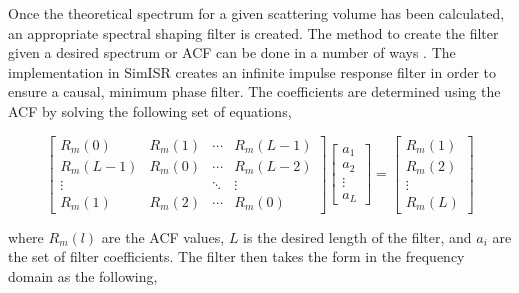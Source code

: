 

Once the theoretical spectrum for a given scattering volume has been calculated, an appropriate spectral shaping filter is created. The method to create the filter given a desired spectrum or ACF can be done in a number of ways \cite{Kasdin:1995wi}. The implementation in SimISR creates an infinite impulse response filter in order to ensure a causal, minimum phase filter. 
The coefficients are determined using the ACF by solving the following set of equations,

\begin{equation}
\label{eq:filtereq}
\begin{bmatrix} R_m(0) & R_m(1)& \cdots & R_m(L-1) \\ R_m(L-1) & R_m(0)& \cdots & R_m(L-2)\\ \vdots & &\ddots  & \vdots \\  R_m(1) & R_m(2) & \cdots & R_m(0) \end{bmatrix} \left[ \begin{array}{c} a_1\\ a_2\\\vdots \\ a_L \end{array} \right]=\left[ \begin{array}{c} R_m(1) \\ R_m(2)\\ \vdots \\R_m(L) \end{array} \right]
\end{equation}

\noindent where $R_m(l)$ are the ACF values, $L$ is the desired length of the filter, and $ a_i$ are the set of filter coefficients. The filter then takes the form in the frequency domain as the following,

